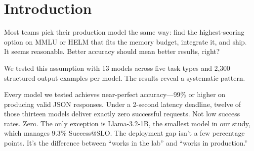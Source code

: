 \documentclass[11pt]{article}
\begin{document}
\begin{abstract}
The deployment gap---the difference between accuracy and Success@SLO---exceeds 90\% for every model we tested. Twelve of thirteen models achieve near-perfect accuracy while delivering zero production value under realistic latency constraints.

Sensitivity analysis across deadline thresholds (2s, 5s, 10s) reveals a striking pattern: at production-realistic deadlines, accuracy has essentially no predictive power for deployment success (Spearman $\rho = 0.09$ at 2s). Even at generous 10-second deadlines, 10 of 13 models change rank between accuracy and Success@SLO orderings. The deployment gap isn't an artifact of aggressive thresholds---it's fundamental.

The pattern holds across vendors and architectures: Meta, Alibaba, Microsoft, Google, OpenAI, Mistral, 01.AI, and TII models from the US, China, France, and UAE all show the same inversion. Bigger models that dominate accuracy leaderboards collapse under latency constraints.

We introduce \emph{Success@SLO}---the fraction of requests that are both correct AND arrive on time. This single metric captures what production systems actually experience. We also release SpecSLOEval, a framework for measuring structure, accuracy, faithfulness, stability, and latency across five task types through a unified evaluation harness.

These findings suggest that accuracy-only evaluation is insufficient for deployment decisions.
\end{abstract}

\section{Introduction}

Most teams pick their production model the same way: find the highest-scoring option on MMLU or HELM that fits the memory budget, integrate it, and ship. It seems reasonable. Better accuracy should mean better results, right?

We tested this assumption with 13 models across five task types and 2,300 structured output examples per model. The results reveal a systematic pattern.

Every model we tested achieves near-perfect accuracy---99\% or higher on producing valid JSON responses. Under a 2-second latency deadline, twelve of those thirteen models deliver exactly zero successful requests. Not low success rates. Zero. The only exception is Llama-3.2-1B, the smallest model in our study, which manages 9.3\% Success@SLO. The deployment gap isn't a few percentage points. It's the difference between ``works in the lab'' and ``works in production.''
\end{document}
